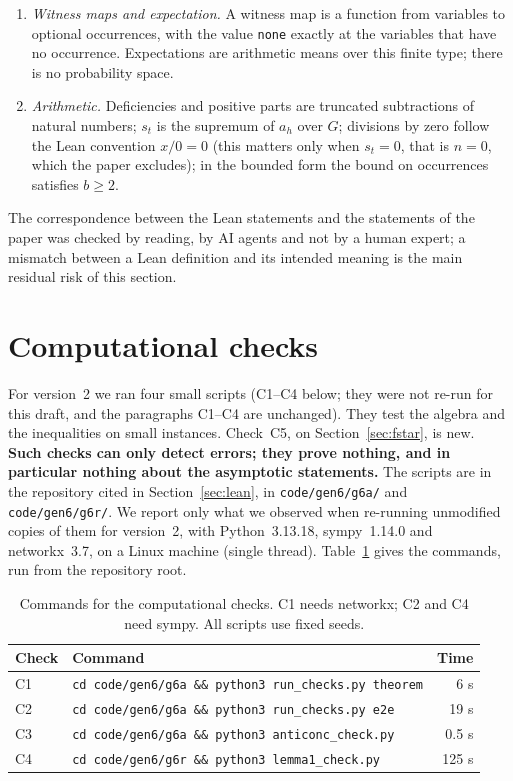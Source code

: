 \documentclass[11pt,a4paper]{article}
\theoremstyle{definition}
\theoremstyle{remark}
\begin{document}
\begin{enumerate}
 one-line sharpening is not formalised.
\item \emph{Witness maps and expectation.} A witness map is a function from variables to
 optional occurrences, with the value \texttt{none} exactly at the variables that have no
 occurrence. Expectations are arithmetic means over this finite type; there is no
 probability space.
\item \emph{Arithmetic.} Deficiencies and positive parts are truncated subtractions of
 natural numbers; $s_t$ is the supremum of $a_h$ over $G$; divisions by zero follow the Lean
 convention $x/0=0$ (this matters only when $s_t=0$, that is $n=0$, which the paper
 excludes); in the bounded form the bound on occurrences satisfies $b\ge2$.
\end{enumerate}
The correspondence between the Lean statements and the statements of the paper was checked
by reading, by AI agents and not by a human expert; a mismatch between a Lean definition and
its intended meaning is the main residual risk of this section.

\section{Computational checks}\label{sec:checks}

For version~2 we ran four small scripts (C1--C4 below; they were not re-run for this
draft, and the paragraphs C1--C4 are unchanged). They test the algebra and the inequalities
on small instances. Check~C5, on Section~\ref{sec:fstar}, is new.
\textbf{Such checks can only detect errors; they prove nothing, and in particular nothing
about the asymptotic statements.} The scripts are in the repository cited in
Section~\ref{sec:lean}, in \texttt{code/gen6/g6a/} and \texttt{code/gen6/g6r/}. We report
only what we observed when re-running unmodified copies of them for version~2, with
Python~3.13.18, sympy~1.14.0 and networkx~3.7, on a Linux machine (single thread).
Table~\ref{tab:checks} gives the commands, run from the repository root.

\begin{table}[htbp]
\centering
\small
\begin{tabular}{@{}llr@{}}
\toprule
Check & Command & Time\\
\midrule
C1 & \texttt{cd code/gen6/g6a \&\& python3 run\_checks.py theorem} & 6 s\\
C2 & \texttt{cd code/gen6/g6a \&\& python3 run\_checks.py e2e} & 19 s\\
C3 & \texttt{cd code/gen6/g6a \&\& python3 anticonc\_check.py} & 0.5 s\\
C4 & \texttt{cd code/gen6/g6r \&\& python3 lemma1\_check.py} & 125 s\\
\bottomrule
\end{tabular}
\caption{Commands for the computational checks. C1 needs networkx; C2 and C4 need
sympy. All scripts use fixed seeds.}\label{tab:checks}
\end{table}
\end{document}
